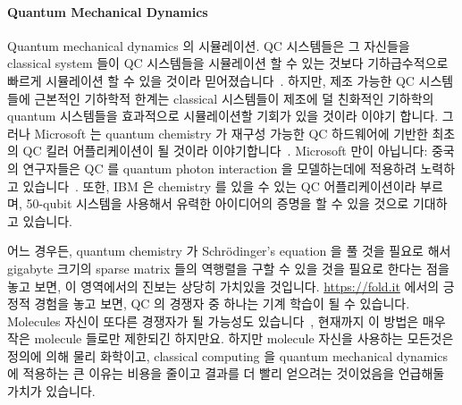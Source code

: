 \paragraph{Quantum Mechanical Dynamics}
\label{sec:future:Quantum Mechanical Dynamics}

Quantum mechanical dynamics 의 시뮬레이션.
QC 시스템들은 그 자신들을 classical system 들이 QC 시스템들을 시뮬레이션 할 수
있는 것보다 기하급수적으로 빠르게 시뮬레이션 할 수 있을 것이라
믿어졌습니다~\cite{Feynman1982}.
하지만, 제조 가능한 QC 시스템들에 근본적인 기하학적 한계는 classical 시스템들이
제조에 덜 친화적인 기하학의 quantum 시스템들을 효과적으로 시뮬레이션할 기회가
있을 것이라 이야기 합니다.
그러나 Microsoft 는 quantum chemistry 가 재구성 가능한 QC 하드웨어에 기반한
최초의 QC 킬러 어플리케이션이 될 것이라
이야기합니다~\cite{TomSimonite2017QC-MS-Chemistry}.
Microsoft 만이 아닙니다: 중국의 연구자들은 QC 를 quantum photon interaction 을
모델하는데에 적용하려 노력하고 있습니다~\cite{StephenChen2017ChinaQC}.
또한, IBM 은 chemistry 를 있을 수 있는 QC 어플리케이션이라 부르며, 50-qubit
시스템을 사용해서 유력한 아이디어의 증명을 할 수 있을 것으로 기대하고 있습니다.

어느 경우든, quantum chemistry 가 Schr\"{o}dinger's equation 을 풀 것을 필요로
해서 gigabyte 크기의 sparse matrix 들의 역행렬을 구할 수 있을 것을 필요로
한다는 점을 놓고 보면, 이 영역에서의 진보는 상당히 가치있을 것입니다.
\url{https://fold.it} 에서의 긍정적 경험을 놓고 보면, QC 의 경쟁자 중 하나는
기계 학습이 될 수 있습니다.
Molecules 자신이 또다른 경쟁자가 될 가능성도
있습니다~\cite{Chin-wenChou2017ManipulateMolecule}, 현재까지 이 방법은 매우
작은 molecule 들로만 제한되긴 하지만요.
하지만 molecule 자신을 사용하는 모든것은 정의에 의해 물리 화학이고, classical
computing 을 quantum mechanical dynamics 에 적용하는 큰 이유는 비용을 줄이고
결과를 더 빨리 얻으려는 것이었음을 언급해둘 가치가 있습니다.
\iffalse

